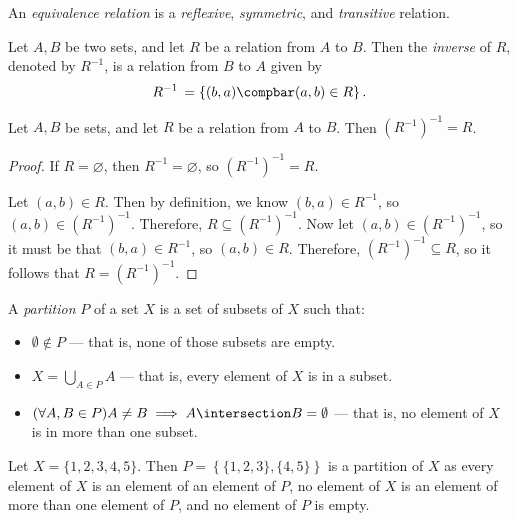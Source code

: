 \documentclass[12pt]{article}
\begin{document}
\begin{defn}\label{equivalence-relation}
    An \emph{equivalence relation} is a \emph{reflexive}, \emph{symmetric}, and \emph{transitive} relation.
\end{defn}

\begin{defn}
    Let $A, B$ be two sets, and let $R$ be a relation from $A$ to $B$. Then the \emph{inverse} of $R$, denoted by $R^{-1}$, is a relation from $B$ to $A$ given by \[R^{-1} \,= \left\{(b, a) \compbar (a, b) \in R \right\}.\]
\end{defn}

\begin{prop}
    Let $A, B$ be sets, and let $R$ be a relation from $A$ to $B$. Then $\left(R^{-1}\right)^{-1} = R$.
\end{prop}

\begin{proof}
    If $R = \varnothing$, then $R^{-1} = \varnothing$, so $\left(R^{-1}\right)^{-1} = R$.

    Let $(a, b) \in R$. Then by definition, we know $(b, a) \in R^{-1}$, so $(a, b) \in \left(R^{-1}\right)^{-1}$. Therefore, $R \subseteq \left(R^{-1}\right)^{-1}$. Now let $(a, b) \in \left(R^{-1}\right)^{-1}$, so it must be that $(b, a) \in R^{-1}$, so $(a, b) \in R$. Therefore, $\left(R^{-1}\right)^{-1} \subseteq R$, so it follows that $R = \left(R^{-1}\right)^{-1}$.
\end{proof}

\begin{defn}\label{partition}
    A \emph{partition} $P$ of a set $X$ is a set of subsets of $X$ such that:
    \begin{itemize}
        \item $\emptyset \notin P$ --- that is, none of those subsets are empty.
        \item $X = \bigcup_{A\in P}A$ --- that is, every element of $X$ is in a subset.
        \item $(\forall A, B \in P) A \neq B \implies A \intersection B = \emptyset$ --- that is, no element of $X$ is in more than one subset.
    \end{itemize}
\end{defn}

\begin{exmp}
    Let $X = \{1, 2, 3, 4, 5\}$. Then $P = \left\{\{1, 2, 3\}, \{4, 5\}\right\}$ is a partition of $X$ as every element of $X$ is an element of an element of $P$, no element of $X$ is an element of more than one element of $P$, and no element of $P$ is empty.
\end{exmp}
\end{document}
